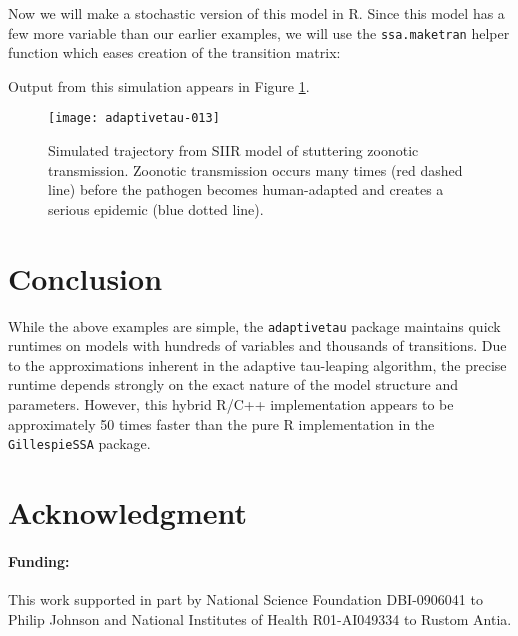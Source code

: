 \documentclass[11pt,nogin]{article}
\begin{document}
Now we will make a stochastic version of this model in R.  Since this model has a few more variable than our earlier examples, we will use the \texttt{ssa.maketran} helper function which eases creation of the transition matrix:
\begin{Schunk}
\end{Schunk}
Output from this simulation appears in Figure \ref{fig-SIR}.
\begin{figure}
  \centerline{
\texttt{[image: adaptivetau-013]}
}\caption{\label{fig-SIR} Simulated trajectory from SIIR model of stuttering zoonotic transmission.  Zoonotic transmission occurs many times (red dashed line) before the pathogen becomes human-adapted and creates a serious epidemic (blue dotted line).}
\end{figure}


\section*{Conclusion}
While the above examples are simple, the \texttt{adaptivetau} package maintains quick runtimes on models with hundreds of variables and thousands of transitions. Due to the approximations inherent in the adaptive tau-leaping algorithm, the precise runtime depends strongly on the exact nature of the model structure and parameters. However, this hybrid R/C++ implementation appears to be approximately 50 times faster than the pure R implementation in the \texttt{GillespieSSA} package.


\section*{Acknowledgment}


\paragraph{Funding:}

This work supported in part by National Science Foundation DBI-0906041 to Philip Johnson and National Institutes of Health R01-AI049334 to Rustom Antia.



\end{document}
